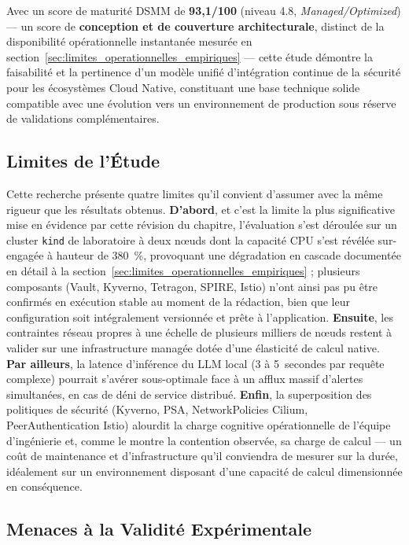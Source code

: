 Avec un score de maturité DSMM de \textbf{93,1/100} (niveau 4.8, \textit{Managed/Optimized}) — un score de \textbf{conception et de couverture architecturale}, distinct de la disponibilité opérationnelle instantanée mesurée en section~\ref{sec:limites_operationnelles_empiriques} — cette étude démontre la faisabilité et la pertinence d'un modèle unifié d'intégration continue de la sécurité pour les écosystèmes Cloud Native, constituant une base technique solide compatible avec une évolution vers un environnement de production sous réserve de validations complémentaires.

\subsection{Limites de l'Étude}

Cette recherche présente quatre limites qu'il convient d'assumer avec la même rigueur que les résultats obtenus. \textbf{D'abord}, et c'est la limite la plus significative mise en évidence par cette révision du chapitre, l'évaluation s'est déroulée sur un cluster \texttt{kind} de laboratoire à deux nœuds dont la capacité CPU s'est révélée sur-engagée à hauteur de 380~\%, provoquant une dégradation en cascade documentée en détail à la section~\ref{sec:limites_operationnelles_empiriques} ; plusieurs composants (Vault, Kyverno, Tetragon, SPIRE, Istio) n'ont ainsi pas pu être confirmés en exécution stable au moment de la rédaction, bien que leur configuration soit intégralement versionnée et prête à l'application. \textbf{Ensuite}, les contraintes réseau propres à une échelle de plusieurs milliers de nœuds restent à valider sur une infrastructure managée dotée d'une élasticité de calcul native. \textbf{Par ailleurs}, la latence d'inférence du LLM local (3 à 5~secondes par requête complexe) pourrait s'avérer sous-optimale face à un afflux massif d'alertes simultanées, en cas de déni de service distribué. \textbf{Enfin}, la superposition des politiques de sécurité (Kyverno, PSA, NetworkPolicies Cilium, PeerAuthentication Istio) alourdit la charge cognitive opérationnelle de l'équipe d'ingénierie et, comme le montre la contention observée, sa charge de calcul — un coût de maintenance et d'infrastructure qu'il conviendra de mesurer sur la durée, idéalement sur un environnement disposant d'une capacité de calcul dimensionnée en conséquence.

\subsection{Menaces à la Validité Expérimentale}
\label{subsec:menaces_validite_exp}

